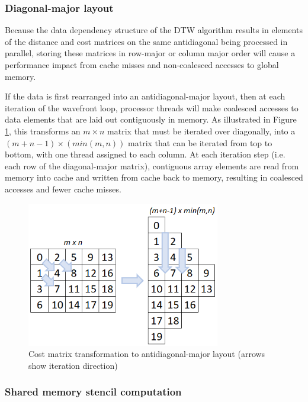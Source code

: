 \documentclass[12pt, letterpaper]{article}
\begin{document}
\subsubsection{Diagonal-major layout}

Because the data dependency structure of the DTW algorithm results in elements
of the distance and cost matrices on the same antidiagonal being processed in
parallel, storing these matrices in row-major or column major order will cause a
performance impact from cache misses and non-coalesced accesses to global
memory.

If the data is first rearranged into an antidiagonal-major layout, then at each
iteration of the wavefront loop, processor threads will make coalesced accesses
to data elements that are laid out contiguously in memory. As illustrated in
Figure \ref{diagonal_layout}, this transforms an $m \times n$ matrix that must be
iterated over diagonally, into a $(m+n-1) \times (min(m,n))$ matrix that can be
iterated from top to bottom, with one thread assigned to each column. At each
iteration step (i.e. each row of the diagonal-major matrix), contiguous array
elements are read from memory into cache and written from cache back to memory,
resulting in coalesced accesses and fewer cache misses.

\begin{figure}[htbp]
  \includegraphics[height=2.5in]{img/diagonal_layout.png}
  \centering
  \caption{Cost matrix transformation to antidiagonal-major layout (arrows show
    iteration direction)}
  \label{diagonal_layout}
  \end{figure}

\subsubsection{Shared memory stencil computation}
\end{document}

